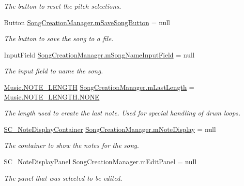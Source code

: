 \begin{DoxyCompactItemize}
\begin{DoxyCompactList}\small\item\em The button to reset the pitch selections. \end{DoxyCompactList}\item 
Button \hyperlink{group___s_c_m_priv_var_gaf43eabc869ead30d8ac7027e07502289}{Song\+Creation\+Manager.\+m\+Save\+Song\+Button} = null
\begin{DoxyCompactList}\small\item\em The button to save the song to a file. \end{DoxyCompactList}\item 
Input\+Field \hyperlink{group___s_c_m_priv_var_ga0dd175c73748d5cc8ba4621f36126255}{Song\+Creation\+Manager.\+m\+Song\+Name\+Input\+Field} = null
\begin{DoxyCompactList}\small\item\em The input field to name the song. \end{DoxyCompactList}\item 
\hyperlink{group___music_enums_gaf11b5f079adbb21c800b9eca1c5c3cbd}{Music.\+N\+O\+T\+E\+\_\+\+L\+E\+N\+G\+TH} \hyperlink{group___s_c_m_priv_var_gaa137adb1c99e9ee59adcfbf7d0cf6249}{Song\+Creation\+Manager.\+m\+Last\+Length} = \hyperlink{group___music_enums_ggaf11b5f079adbb21c800b9eca1c5c3cbdab50339a10e1de285ac99d4c3990b8693}{Music.\+N\+O\+T\+E\+\_\+\+L\+E\+N\+G\+T\+H.\+N\+O\+NE}
\begin{DoxyCompactList}\small\item\em The length used to create the last note. Used for special handling of drum loops. \end{DoxyCompactList}\item 
\hyperlink{class_s_c___note_display_container}{S\+C\+\_\+\+Note\+Display\+Container} \hyperlink{group___s_c_m_priv_var_ga308f19d1b2020fc625c12dd08ee16b1c}{Song\+Creation\+Manager.\+m\+Note\+Display} = null
\begin{DoxyCompactList}\small\item\em The container to show the notes for the song. \end{DoxyCompactList}\item 
\hyperlink{class_s_c___note_display_panel}{S\+C\+\_\+\+Note\+Display\+Panel} \hyperlink{group___s_c_m_priv_var_gad063b650cf7112be19edaf1a2033ea4d}{Song\+Creation\+Manager.\+m\+Edit\+Panel} = null
\begin{DoxyCompactList}\small\item\em The panel that was selected to be edited. \end{DoxyCompactList}\item 

\end{DoxyCompactItemize}
